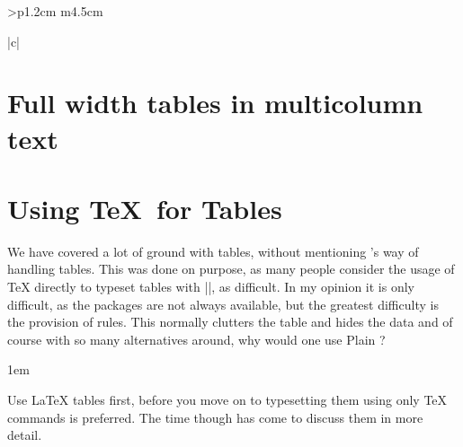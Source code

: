 \begin{tabular}{>{\bfseries}p{1.2cm} m{4.5cm}}
\begin{tabular}[t]{|c|}
\begin{longtable}
\begin{scriptexample}{}{}
\section{Full width tables in multicolumn text}


\clearpage

\section{Using \TeX\ for Tables}
  
We have covered a lot of ground with \latex tables, without mentioning \tex's way of handling tables. This was done on purpose, as many people consider the usage of TeX directly to typeset tables with |\halign|, as difficult. In my opinion it is only difficult, as the packages are not always available, but the greatest difficulty is the provision of rules. This normally clutters the table and hides the data and of course with so many alternatives around, why would one use Plain \tex?

\parindent1em

Use LaTeX tables first, before you move on to typesetting them using only TeX commands is preferred. The time though has come to discuss them in more detail.


\end{scriptexample}
\end{longtable}
\end{tabular}
\end{tabular}
